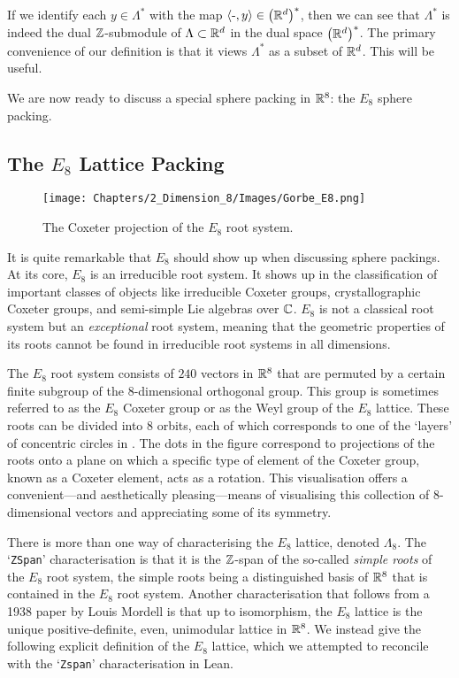 If we identify each $y \in \Lambda^*$ with the map $\left\langle \text{-}, y \right\rangle \in \left( \mathbb{R}^d \right)^*$, then we can see that $\Lambda^*$ is indeed the dual $\mathbb{Z}$-submodule of $\Lambda \subset \mathbb{R}^d$ in the dual space $\left( \mathbb{R}^{d} \right)^*$. The primary convenience of our definition is that it views $\Lambda^*$ as a subset of $\mathbb{R}^d$. This will be useful.

We are now ready to discuss a special sphere packing in $\mathbb{R}^8$: the $E_8$ sphere packing.

\subsection{The $E_8$ Lattice Packing}\label{Ch2:Subsec:E8}

\begin{wrapfigure}[18]{r}{0.5\linewidth}
    \vspace{-3em}
    \centering
    \texttt{[image: Chapters/2\_Dimension\_8/Images/Gorbe\_E8.png]}
    \caption{The Coxeter projection of the $E_8$ root system. \cite{Gorbe_E8}}
    \label{Ch2:Fig:Gorbe_E8}
\end{wrapfigure}

It is quite remarkable that $E_8$ should show up when discussing sphere packings. At its core, $E_8$ is an irreducible root system. It shows up in the classification of important classes of objects like irreducible Coxeter groups, crystallographic Coxeter groups, and semi-simple Lie algebras over $\mathbb{C}$. $E_8$ is not a classical root system but an \textit{exceptional} root system, meaning that the geometric properties of its roots cannot be found in irreducible root systems in all dimensions.

The $E_8$ root system consists of $240$ vectors in $\mathbb{R}^8$ that are permuted by a certain finite subgroup of the $8$-dimensional orthogonal group. This group is sometimes referred to as the $E_8$ Coxeter group or as the Weyl group of the $E_8$ lattice. These roots can be divided into $8$ orbits, each of which corresponds to one of the `layers' of concentric circles in . The dots in the figure correspond to projections of the roots onto a plane on which a specific type of element of the Coxeter group, known as a Coxeter element, acts as a rotation. This visualisation offers a convenient---and aesthetically pleasing---means of visualising this collection of $8$-dimensional vectors and appreciating some of its symmetry.

There is more than one way of characterising the $E_8$ lattice, denoted $\Lambda_8$. The `\verb|ZSpan|' characterisation is that it is the $\mathbb{Z}$-span of the so-called \textit{simple roots} of the $E_8$ root system, the simple roots being a distinguished basis of $\mathbb{R}^8$ that is contained in the $E_8$ root system. Another characterisation that follows from a 1938 paper by Louis Mordell is that up to isomorphism, the $E_8$ lattice is the unique positive-definite, even, unimodular lattice in $\mathbb{R}^8$. We instead give the following explicit definition of the $E_8$ lattice, which we attempted to reconcile with the `\verb|Zspan|' characterisation in Lean.

